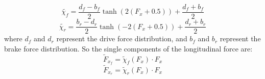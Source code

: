 \documentclass[a4paper, onecolumn, 11pt, twoside]{article}
\begin{document}
\begin{equation}
    \tilde{\chi_f} = \frac{d_f - b_f}{2}\tanh(2(F_x+0.5))+\frac{d_f+b_f}{2}
\end{equation}
\begin{equation}
    \tilde{\chi_r} = \frac{b_r-d_r}{2}\tanh(-2(F_x+0.5))+\frac{d_r+b_r}{2}
\end{equation}
where $d_f$ and $d_r$ represent the drive force distribution, and $b_f$ and $b_r$ represent the 
brake force distribution. So the single components of the longitudinal force are:
\begin{equation}
    \tilde{F}_{x_f} = \tilde{\chi}_f(F_x) \cdot F_x
\end{equation}
\begin{equation}
    \tilde{F}_{x_r} = \tilde{\chi}_r(F_x) \cdot F_x
\end{equation}
\end{document}
